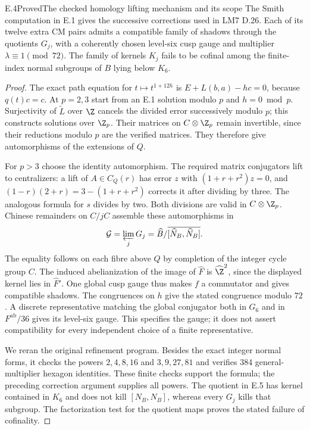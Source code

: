 \begin{statement}{E.4}{Proved}{The checked homology lifting mechanism and its scope}
The Smith computation in E.1 gives the successive corrections used in
LM7 D.26. Each of its twelve extra CM pairs admits a compatible family
of shadows through the quotients $G_j$, with a coherently chosen
level-six cusp gauge and multiplier $\lambda\equiv1\pmod{72}$.
The family of kernels $K_j$ fails to be cofinal among the finite-index
normal subgroups of $B$ lying below $K_6$.
\end{statement}
\begin{proof}
The exact path equation for $t\mapsto t^{1+12h}$ is
$E+L(b,a)-hc=0$, because $q(t)c=c$. At $p=2,3$ start from an E.1
solution modulo $p$ and $h=0\bmod p$. Surjectivity of $\widetilde L$
over $\Z$ cancels the divided error successively modulo $p$; this
constructs solutions over $\Z_p$. Their matrices on $C\otimes\Z_p$
remain invertible, since their reductions modulo $p$ are the verified
matrices. They therefore give automorphisms of the extensions of $Q$.

For $p>3$ choose the identity automorphism. The required matrix
conjugators lift to centralizers: a lift of $A\in C_Q(r)$ has error
$z$ with $(1+r+r^2)z=0$, and
$(1-r)(2+r)=3-(1+r+r^2)$ corrects it after dividing by three.
The analogous formula for $s$ divides by two. Both divisions are
valid in $C\otimes\Z_p$. Chinese remainders on $C/jC$ assemble these
automorphisms in
\[
 \mathcal G=\varprojlim_j G_j
   =\widehat B/\overline{[\widehat N_B,\widehat N_B]}.
\]
The equality follows on each fibre above $Q$ by completion of the
integer cycle group $C$. The induced abelianization of the image of
$\widehat F$ is $\widehat\Z^2$, since the displayed kernel lies in
$\widehat F'$. One global cusp gauge thus makes $f$ a commutator
and gives compatible shadows. The congruences on $h$ give the stated
congruence modulo $72$. A discrete representative matching the global
conjugator both in $G_6$ and in $F^{\mathrm{ab}}/36$ gives its level-six
gauge. This specifies the gauge; it does not assert compatibility for
every independent choice of a finite representative.

We reran the original refinement program. Besides the exact integer
normal forms, it checks the powers $2,4,8,16$ and $3,9,27,81$ and
verifies 384 general-multiplier hexagon identities. These finite
checks support the formula; the preceding correction argument supplies
all powers. The quotient in E.5 has kernel contained in $K_6$ and
does not kill $[N_B,N_B]$, whereas every $G_j$ kills that subgroup.
The factorization test for the quotient maps proves the stated
failure of cofinality.
\end{proof}

